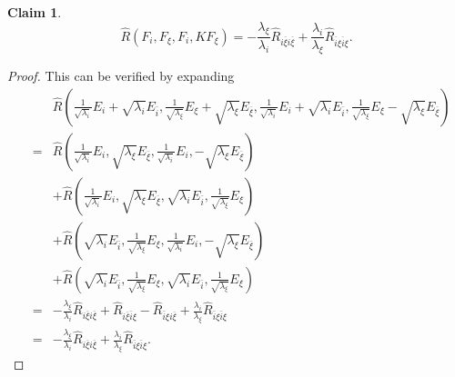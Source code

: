 \documentclass[12pt,letterpaper]{amsart}%
\newcounter{mycounter}
\numberwithin{mycounter}{section}
\theoremstyle{plain}
\newtheorem{claim}[mycounter]{Claim}
\numberwithin{equation}{section}
\theoremstyle{definition}
\newcommand{\maxidx}{\mathord{\xi}} %
\begin{document}
\begin{claim}\label{a67}
\begin{equation*}
\hat{R}(F_{i},F_{\maxidx},F_{i},KF_{\maxidx})
= -\frac{\lambda_{\maxidx}}{\lambda_{i}} \hat{R}_{i\overline{\maxidx} i\overline{\maxidx}}
  + \frac{\lambda_{i}}{\lambda_{\maxidx}} \hat{R}_{\overline{i} \maxidx \overline{i} \maxidx}.
\end{equation*}
\end{claim}
\begin{proof}
    
This can be verified by expanding 
\begin{eqnarray*}
&&\hat{R}\!\left(
\frac{1}{\sqrt{\lambda_{i}}}E_{i}+\sqrt{\lambda_{i}}E_{\bar{i}},
\frac{1}{\sqrt{\lambda_{\maxidx}}}E_{\maxidx}+\sqrt{\lambda_{\maxidx}}E_{\overline{\maxidx}},
\frac{1}{\sqrt{\lambda_{i}}}E_{i}+\sqrt{\lambda_{i}}E_{\bar{i}},
\frac{1}{\sqrt{\lambda_{\maxidx}}}E_{\maxidx}-\sqrt{\lambda_{\maxidx}}E_{\overline{\maxidx}}
\right)
\\
&=& \hat{R}\!\left(
\frac{1}{\sqrt{\lambda_{i}}}E_{i},\sqrt{\lambda_{\maxidx}}E_{\overline{\maxidx}},
\frac{1}{\sqrt{\lambda_{i}}}E_{i},-\sqrt{\lambda_{\maxidx}}E_{\overline{\maxidx}}
\right)
\\
&&+ \hat{R}\!\left(
\frac{1}{\sqrt{\lambda_{i}}}E_{i},\sqrt{\lambda_{\maxidx}}E_{\overline{\maxidx}},
\sqrt{\lambda_{i}}E_{\bar{i}},\frac{1}{\sqrt{\lambda_{\maxidx}}}E_{\maxidx}
\right)
\\
&&+ \hat{R}\!\left(
\sqrt{\lambda_{i}}E_{\bar{i}},\frac{1}{\sqrt{\lambda_{\maxidx}}}E_{\maxidx},
\frac{1}{\sqrt{\lambda_{i}}}E_{i},-\sqrt{\lambda_{\maxidx}}E_{\overline{\maxidx}}
\right)
\\
&&+ \hat{R}\!\left(
\sqrt{\lambda_{i}}E_{\bar{i}},\frac{1}{\sqrt{\lambda_{\maxidx}}}E_{\maxidx},
\sqrt{\lambda_{i}}E_{\bar{i}},\frac{1}{\sqrt{\lambda_{\maxidx}}}E_{\maxidx}
\right)
\\
&=& -\frac{\lambda_{\maxidx}}{\lambda_{i}} \hat{R}_{i\overline{\maxidx} i\overline{\maxidx}}
    + \hat{R}_{i\overline{\maxidx}\bar{i}\maxidx}
    - \hat{R}_{\bar{i}\maxidx i\overline{\maxidx}}
    + \frac{\lambda_{i}}{\lambda_{\maxidx}} \hat{R}_{\bar{i}\maxidx\bar{i}\maxidx}
\\
&=& -\frac{\lambda_{\maxidx}}{\lambda_{i}} \hat{R}_{i\overline{\maxidx} i\overline{\maxidx}}
    + \frac{\lambda_{i}}{\lambda_{\maxidx}} \hat{R}_{\bar{i}\maxidx\bar{i}\maxidx}.
\end{eqnarray*}

\end{proof}
\end{document}
